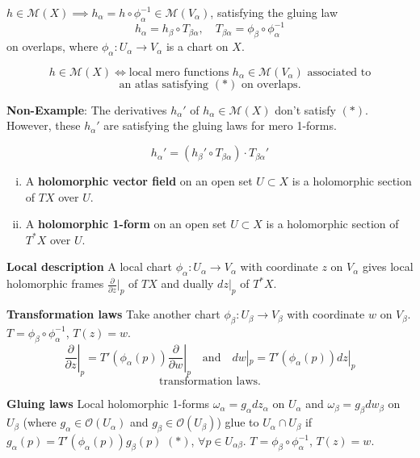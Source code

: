 \documentclass{article}
\begin{document}
\begin{example}
$h \in \mathcal{M}(X) \implies h_\alpha = h \circ \phi_\alpha^{-1} \in \mathcal{M}(V_\alpha)$, satisfying the gluing law
$$h_\alpha = h_\beta \circ T_{\beta \alpha}, \quad T_{\beta \alpha} = \phi_\beta \circ \phi_\alpha^{-1}$$
on overlaps, where $\phi_\alpha: U_\alpha \to V_\alpha$ is a chart on $X$.
\end{example}

$$h \in \mathcal{M}(X) \iff \text{local mero functions } h_\alpha \in \mathcal{M}(V_\alpha) \text{ associated to}$$
$$\text{an atlas satisfying } (*) \text{ on overlaps.}$$

\textbf{Non-Example}: The derivatives $h_\alpha'$ of $h_\alpha \in \mathcal{M}(X)$ don't satisfy $(*)$.
However, these $h_\alpha'$ are satisfying the gluing laws for mero 1-forms.

$$h_\alpha' = (h_\beta' \circ T_{\beta \alpha}) \cdot T_{\beta \alpha}'$$

\begin{definition}
\begin{enumerate}[(i)]
    \item A \textbf{holomorphic vector field} on an open set $U \subset X$ is a holomorphic section of $TX$ over $U$.
    \item A \textbf{holomorphic 1-form} on an open set $U \subset X$ is a holomorphic section of $T^*X$ over $U$.
\end{enumerate}
\end{definition}

\textbf{Local description}
A local chart $\phi_\alpha: U_\alpha \to V_\alpha$ with coordinate $z$ on $V_\alpha$ gives local holomorphic frames $\frac{\partial}{\partial z}|_p$ of $TX$ and dually $dz|_p$ of $T^*X$.

\textbf{Transformation laws}
Take another chart $\phi_\beta: U_\beta \to V_\beta$ with coordinate $w$ on $V_\beta$. $T = \phi_\beta \circ \phi_\alpha^{-1}$, $T(z) = w$.
$$\left. \frac{\partial}{\partial z} \right|_p = T'( \phi_\alpha(p) ) \left. \frac{\partial}{\partial w} \right|_p \quad \text{and} \quad dw|_p = T'(\phi_\alpha(p)) dz|_p$$
$$ \text{transformation laws.} $$

\textbf{Gluing laws}
Local holomorphic 1-forms $\omega_\alpha = g_\alpha dz_\alpha$ on $U_\alpha$ and $\omega_\beta = g_\beta dw_\beta$ on $U_\beta$
(where $g_\alpha \in \mathcal{O}(U_\alpha)$ and $g_\beta \in \mathcal{O}(U_\beta)$)
glue to $U_\alpha \cap U_\beta$ if $g_\alpha(p) = T'(\phi_\alpha(p)) g_\beta(p)$ $(\ast)$, $\forall p \in U_{\alpha \beta}$.
$T = \phi_\beta \circ \phi_\alpha^{-1}$, $T(z) = w$.
\end{document}
